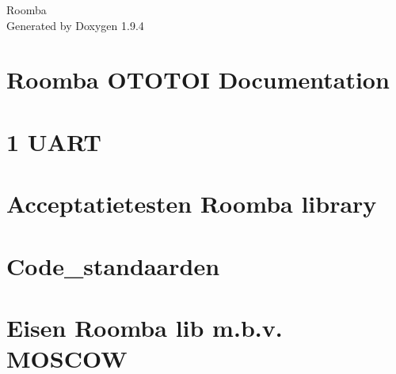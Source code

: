 \documentclass[twoside]{book}
\newcommand{\+}{\discretionary{\mbox{\scriptsize$\hookleftarrow$}}{}{}}
\newcommand{\clearemptydoublepage}{%
    \newpage{\pagestyle{empty}\cleardoublepage}%
  }
\begin{document}
  \raggedbottom
    \hypersetup{pageanchor=false,
                bookmarksnumbered=true,
                pdfencoding=unicode
               }
  \begin{titlepage}
  \vspace*{7cm}
  \begin{center}%
  {\Large Roomba}\\
  \vspace*{1cm}
  {\large Generated by Doxygen 1.9.4}\\
  \end{center}
  \end{titlepage}
  \clearemptydoublepage
  \tableofcontents
  \clearemptydoublepage
  \hypersetup{pageanchor=true}
\chapter{Roomba OTOTOI Documentation}
\label{index}\hypertarget{index}{}
\chapter{1 UART}
\label{md__doc_pages__subsystems}

\chapter{Acceptatietesten Roomba library}
\label{md__c___users_crtak__roomba_project_cpp__documentatie__m_d__acceptatietesten__r_o_o_m_b_a__lib}

\chapter{Code\+\_\+standaarden}
\label{md__c___users_crtak__roomba_project_cpp__documentatie__m_d__code_standaarden}

\chapter{Eisen Roomba lib m.\+b.\+v. MOSCOW}
\label{md__c___users_crtak__roomba_project_cpp__documentatie__m_d__eisen__r_o_o_m_b_a_lib}

\end{document}
